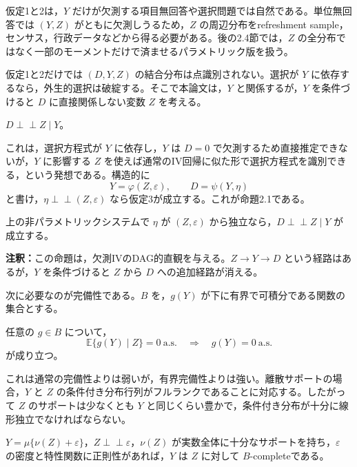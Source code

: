 \documentclass[10pt,a4paper]{article}
\newcommand{\indep}{\mathrel{\perp\!\!\!\perp}}
\newcommand{\E}{\mathbb{E}}
\newcommand{\note}[1]{\par\smallskip\noindent\textbf{注釈：}#1\par\smallskip}
\begin{document}
仮定1と2は，$Y$ だけが欠測する項目無回答や選択問題では自然である。単位無回答では $(Y,Z)$ がともに欠測しうるため，$Z$ の周辺分布をrefreshment sample，センサス，行政データなどから得る必要がある。後の2.4節では，$Z$ の全分布ではなく一部のモーメントだけで済ませるパラメトリック版を扱う。

仮定1と2だけでは $(D,Y,Z)$ の結合分布は点識別されない。選択が $Y$ に依存するなら，外生的選択は破綻する。そこで本論文は，$Y$ と関係するが，$Y$ を条件づけると $D$ に直接関係しない変数 $Z$ を考える。

\begin{description}[leftmargin=3.2em]
\item[仮定3] $D\indep Z\mid Y$。
\end{description}

これは，選択方程式が $Y$ に依存し，$Y$ は $D=0$ で欠測するため直接推定できないが，$Y$ に影響する $Z$ を使えば通常のIV回帰に似た形で選択方程式を識別できる，という発想である。構造的に
\[
Y=\varphi(Z,\varepsilon),\qquad D=\psi(Y,\eta)
\]
と書け，$\eta\indep (Z,\varepsilon)$ なら仮定3が成立する。これが命題2.1である。

\begin{description}[leftmargin=3.2em]
\item[命題2.1] 上の非パラメトリックシステムで $\eta$ が $(Z,\varepsilon)$ から独立なら，$D\indep Z\mid Y$ が成立する。
\end{description}

\note{この命題は，欠測IVのDAG的直観を与える。$Z\to Y\to D$ という経路はあるが，$Y$ を条件づけると $Z$ から $D$ への追加経路が消える。}

次に必要なのが完備性である。$B$ を，$g(Y)$ が下に有界で可積分である関数の集合とする。

\begin{description}[leftmargin=3.2em]
\item[仮定4] 任意の $g\in B$ について，
\[
\E\{g(Y)\mid Z\}=0\ \text{a.s.}\quad\Rightarrow\quad g(Y)=0\ \text{a.s.}
\]
が成り立つ。
\end{description}

これは通常の完備性よりは弱いが，有界完備性よりは強い。離散サポートの場合，$Y$ と $Z$ の条件付き分布行列がフルランクであることに対応する。したがって $Z$ のサポートは少なくとも $Y$ と同じくらい豊かで，条件付き分布が十分に線形独立でなければならない。

\begin{description}[leftmargin=3.2em]
\item[命題2.2] $Y=\mu\{\nu(Z)+\varepsilon\}$，$Z\indep\varepsilon$，$\nu(Z)$ が実数全体に十分なサポートを持ち，$\varepsilon$ の密度と特性関数に正則性があれば，$Y$ は $Z$ に対して $B$-completeである。
\end{description}
\end{document}
